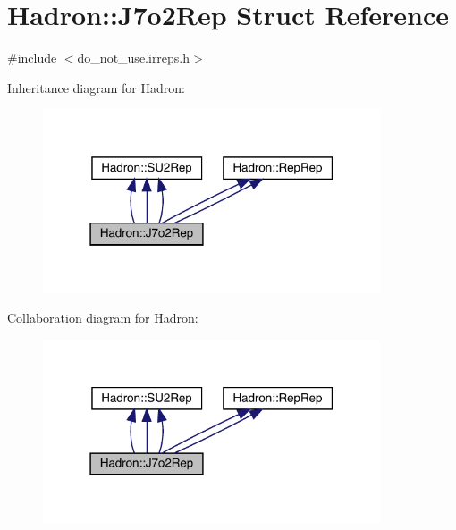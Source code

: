 \hypertarget{structHadron_1_1J7o2Rep}{}\section{Hadron\+:\+:J7o2\+Rep Struct Reference}
\label{structHadron_1_1J7o2Rep}


{\ttfamily \#include $<$do\+\_\+not\+\_\+use.\+irreps.\+h$>$}



Inheritance diagram for Hadron\+:
\nopagebreak
\begin{figure}[H]
\begin{center}
\leavevmode
\includegraphics[width=283pt]{d1/d91/structHadron_1_1J7o2Rep__inherit__graph}
\end{center}
\end{figure}


Collaboration diagram for Hadron\+:
\nopagebreak
\begin{figure}[H]
\begin{center}
\leavevmode
\includegraphics[width=283pt]{d6/dd0/structHadron_1_1J7o2Rep__coll__graph}
\end{center}
\end{figure}
